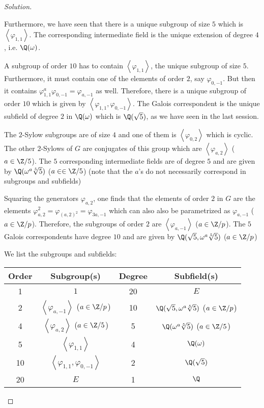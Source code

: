 \documentclass[a4paper,10pt,reqno]{amsart}
\newenvironment{sol}
  {\renewcommand\qedsymbol{$\blacksquare$}\begin{proof}[Solution]}
  {\end{proof}}
\begin{document}
\begin{sol}
\begin{enumerate}[label=(\roman*)]
    Furthermore, we have seen that there is a unique subgroup of size $5$ which is $\left\langle \varphi_{1,1} \right\rangle$. The corresponding intermediate field is the unique extension of degree $4$, i.e. $\Q(\omega)$.

    A subgroup of order $10$ has to contain $\left\langle \varphi_{1,1} \right\rangle$, the unique subgroup of size $5$. Furthermore, it must contain one of the elements of order $2$, say $\varphi_{0,-1}$. But then it contains $\varphi_{1,1}^a \varphi_{0,-1} = \varphi_{a,-1}$ as well. Therefore, there is a unique subgroup of order $10$ which is given by $\left\langle \varphi_{1,1}, \varphi_{0,-1} \right\rangle$. The Galois correspondent is the unique subfield of degree $2$ in $\Q(\omega)$ which is $\Q(\sqrt{5})$, as we have seen in the last session.

    The $2$-Sylow subgroups are of size $4$ and one of them is $\left\langle \varphi_{0,2} \right\rangle$ which is cyclic. The other $2$-Sylows of $G$ are conjugates of this group which are $\left\langle \varphi_{a,2} \right\rangle$ ($a \in \Z/5$). The $5$ corresponding intermediate fields are of degree $5$ and are given by $\Q(\omega^a\sqrt[5]{5})$ ($a \in \in \Z/5$) (note that the $a$'s do not necessarily correspond in subgroups and subfields)

    Squaring the generators $\varphi_{a,2}$, one finds that the elements of order $2$ in $G$ are the elements $\varphi_{a,2}^2 = \varphi_{(a,2)^2} = \varphi_{3a,-1}$ which can also also be parametrized as $\varphi_{a,-1}$ ($a \in \Z/p$). Therefore, the subgroups of order $2$ are $\left\langle \varphi_{a,-1} \right\rangle$ ($a \in \Z/p$). The $5$ Galois correspondents have degree $10$ and are given by $\Q(\sqrt{5},\omega^a\sqrt[5]{5})$ ($a \in \Z/p$)

    We list the subgroups and subfields:

\begin{center}
    \begin{tabular}{c|c| c | c}
        Order &  Subgroup(s) & Degree & Subfield(s) \\ \hline
        1 & $1$ & 20 & $E$\\
        2 & $\left\langle \varphi_{a,-1} \right\rangle$ ($a \in \Z/p$) & 10 & $\Q(\sqrt{5},\omega^a\sqrt[5]{5})$ ($a \in \Z/p$) \\
        4 & $\left\langle \varphi_{a,2} \right\rangle$ ($a \in \Z/5$)  & 5 &  $\Q(\omega^a\sqrt[5]{5})$ ($a \in \Z/5$) \\
        5 & $\left\langle \varphi_{1,1} \right\rangle$ & 4 & $\Q(\omega)$ \\
        10 & $\left\langle \varphi_{1,1}, \varphi_{0,-1} \right\rangle$  & 2 & $\Q(\sqrt{5})$ \\
        20 & $E$ & 1 & $\Q$
        \end{tabular}

\end{center}
    \end{enumerate}
\end{sol}
\end{document}
